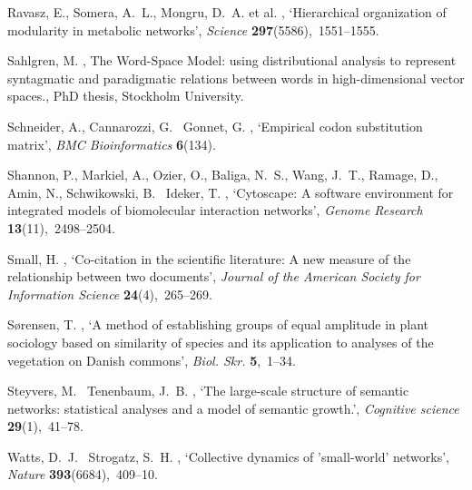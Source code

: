\documentclass{kais}
\begin{document}
\begin{thebibliography}{xx}
Ravasz, E., Somera, A.~L., Mongru, D.~A. et al. \harvardyearright , 
`Hierarchical organization of modularity in metabolic networks', {\em Science} {\bf
  297}(5586),~1551--1555.

Sahlgren, M.  \harvardyearright , {The Word-Space Model:
  using distributional analysis to represent syntagmatic and paradigmatic
  relations between words in high-dimensional vector spaces.}, PhD thesis,
  Stockholm University.

Schneider, A., Cannarozzi, G. \harvardand\ Gonnet, G.  \harvardyearleft
  2005\harvardyearright , `Empirical codon substitution matrix', {\em BMC
  Bioinformatics} {\bf 6}(134).

Shannon, P., Markiel, A., Ozier, O., Baliga, N.~S., Wang, J.~T., Ramage, D.,
  Amin, N., Schwikowski, B. \harvardand\ Ideker, T.  \harvardyearleft
  2003\harvardyearright , `Cytoscape: A software environment for integrated
  models of biomolecular interaction networks', {\em Genome Research} {\bf
  13}(11),~2498--2504.

Small, H.  \harvardyearright , `Co-citation in the
  scientific literature: A new measure of the relationship between two
  documents', {\em Journal of the American Society for Information Science}
  {\bf 24}(4),~265--269.

S{\o}rensen, T.  \harvardyearright , `{A method of
  establishing groups of equal amplitude in plant sociology based on similarity
  of species and its application to analyses of the vegetation on Danish
  commons}', {\em {Biol. Skr.}} {\bf 5},~1--34.

Steyvers, M. \harvardand\ Tenenbaum, J.~B.  \harvardyearleft
  2005\harvardyearright , `{The large-scale structure of semantic networks:
  statistical analyses and a model of semantic growth.}', {\em Cognitive
  science} {\bf 29}(1),~41--78.

Watts, D.~J. \harvardand\ Strogatz, S.~H.  \harvardyearleft
  1998\harvardyearright , `{Collective dynamics of 'small-world' networks}',
  {\em Nature} {\bf 393}(6684),~409--10.


\end{thebibliography}
\end{document}

